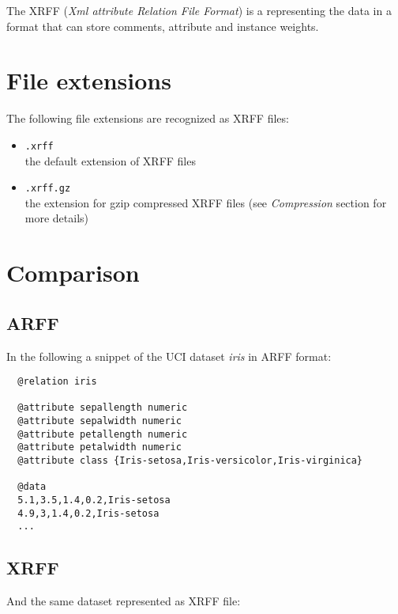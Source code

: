 
The XRFF (\textit{Xml attribute Relation File Format}) is a representing
the data in a format that can store comments, attribute and instance weights.

\section{File extensions}
The following file extensions are recognized as XRFF files:

\begin{itemize}
	\item \texttt{.xrff} \\
		the default extension of XRFF files
	\item \texttt{.xrff.gz} \\
		the extension for gzip compressed XRFF files (see \textit{Compression} section for more details)
\end{itemize}

\section{Comparison}

\subsection{ARFF}
In the following a snippet of the UCI dataset \textit{iris} in ARFF format:

\begin{verbatim}
  @relation iris

  @attribute sepallength numeric
  @attribute sepalwidth numeric
  @attribute petallength numeric
  @attribute petalwidth numeric
  @attribute class {Iris-setosa,Iris-versicolor,Iris-virginica}

  @data
  5.1,3.5,1.4,0.2,Iris-setosa
  4.9,3,1.4,0.2,Iris-setosa
  ...
\end{verbatim}

\subsection{XRFF}
And the same dataset represented as XRFF file:

